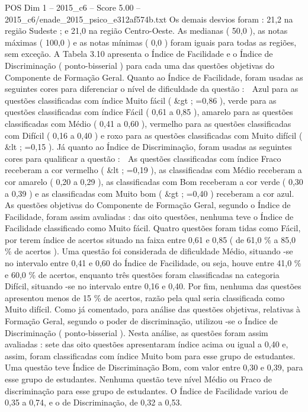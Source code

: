 \begin{textsample}{POS Dim 1 – 2015\_c6 – Score 5.00 – 2015\_c6/enade\_2015\_psico\_e312af574b.txt}
Os demais desvios foram : 21,2 na região Sudeste ; e 21,0 na região Centro-Oeste.
As medianas ( 50,0 ), as notas máximas ( 100,0 ) e as notas mínimas ( 0,0 ) foram iguais para todas as regiões, sem exceção.
A Tabela 3.10 apresenta o Índice de Facilidade e o Índice de Discriminação ( ponto-bisserial ) para cada uma das questões objetivas do Componente de Formação Geral.
Quanto ao Índice de Facilidade, foram usadas as seguintes cores para diferenciar o nível de dificuldade da questão :  Azul para as questões classificadas com índice Muito fácil ( \&gt ; =0,86 ), verde para as questões classificadas com índice Fácil ( 0,61 a 0,85 ), amarelo para as questões classificadas com Médio ( 0,41 a 0,60 ), vermelho para as questões classificadas com Difícil ( 0,16 a 0,40 ) e roxo para as questões classificadas com Muito difícil ( \&lt ; =0,15 ).
Já quanto ao Índice de Discriminação, foram usadas as seguintes cores para qualificar a questão :  As questões classificadas com índice Fraco receberam a cor vermelho ( \&lt ; =0,19 ), as classificadas com Médio receberam a cor amarelo ( 0,20 a 0,29 ), as classificadas com Bom receberam a cor verde ( 0,30 a 0,39 ) e as classificadas com Muito bom ( \&gt ; =0,40 ) receberam a cor azul.
As questões objetivas do Componente de Formação Geral, segundo o Índice de Facilidade, foram assim avaliadas : das oito questões, nenhuma teve o Índice de Facilidade classificado como Muito fácil.
Quatro questões foram tidas como Fácil, por terem índice de acertos situado na faixa entre 0,61 e 0,85 ( de 61,0 \% a 85,0 \% de acertos ).
Uma questão foi considerada de dificuldade Médio, situando -se no intervalo entre 0,41 e 0,60 do Índice de Facilidade, ou seja, houve entre 41,0 \% e 60,0 \% de acertos, enquanto três questões foram classificadas na categoria Difícil, situando -se no intervalo entre 0,16 e 0,40.
Por fim, nenhuma das questões apresentou menos de 15 \% de acertos, razão pela qual seria classificada como Muito difícil.
Como já comentado, para análise das questões objetivas, relativas à Formação Geral, segundo o poder de discriminação, utilizou -se o Índice de Discriminação ( ponto-bisserial ).
Nesta análise, as questões foram assim avaliadas : sete das oito questões apresentaram índice acima ou igual a 0,40 e, assim, foram classificadas com índice Muito bom para esse grupo de estudantes.
Uma questão teve Índice de Discriminação Bom, com valor entre 0,30 e 0,39, para esse grupo de estudantes.
Nenhuma questão teve nível Médio ou Fraco de discriminação para esse grupo de estudantes.
O Índice de Facilidade variou de 0,35 a 0,74, e o de Discriminação, de 0,32 a 0,53.

\end{textsample}
